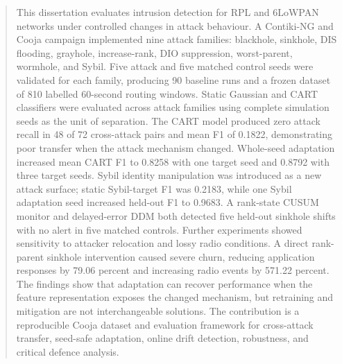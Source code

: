\begin{abstract}
This dissertation evaluates intrusion detection for RPL and 6LoWPAN networks under controlled changes in attack behaviour. A Contiki-NG and Cooja campaign implemented nine attack families: blackhole, sinkhole, DIS flooding, grayhole, increase-rank, DIO suppression, worst-parent, wormhole, and Sybil. Five attack and five matched control seeds were validated for each family, producing 90 baseline runs and a frozen dataset of 810 labelled 60-second routing windows. Static Gaussian and CART classifiers were evaluated across attack families using complete simulation seeds as the unit of separation. The CART model produced zero attack recall in 48 of 72 cross-attack pairs and mean F1 of 0.1822, demonstrating poor transfer when the attack mechanism changed. Whole-seed adaptation increased mean CART F1 to 0.8258 with one target seed and 0.8792 with three target seeds. Sybil identity manipulation was introduced as a new attack surface; static Sybil-target F1 was 0.2183, while one Sybil adaptation seed increased held-out F1 to 0.9683. A rank-state CUSUM monitor and delayed-error DDM both detected five held-out sinkhole shifts with no alert in five matched controls. Further experiments showed sensitivity to attacker relocation and lossy radio conditions. A direct rank-parent sinkhole intervention caused severe churn, reducing application responses by 79.06 percent and increasing radio events by 571.22 percent. The findings show that adaptation can recover performance when the feature representation exposes the changed mechanism, but retraining and mitigation are not interchangeable solutions. The contribution is a reproducible Cooja dataset and evaluation framework for cross-attack transfer, seed-safe adaptation, online drift detection, robustness, and critical defence analysis.
\end{abstract}
